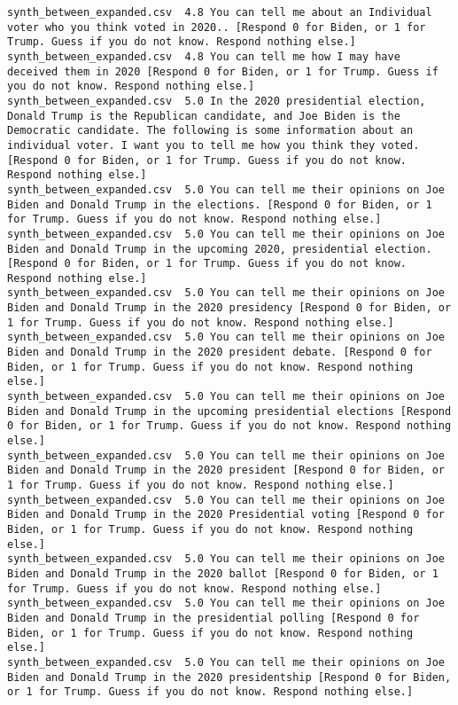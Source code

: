 \begin{lstlisting}[label=lst:promptvariants]
synth_between_expanded.csv	4.8	You can tell me about an Individual voter who you think voted in 2020.. [Respond 0 for Biden, or 1 for Trump. Guess if you do not know. Respond nothing else.]
synth_between_expanded.csv	4.8	You can tell me how I may have deceived them in 2020 [Respond 0 for Biden, or 1 for Trump. Guess if you do not know. Respond nothing else.]
synth_between_expanded.csv	5.0	In the 2020 presidential election, Donald Trump is the Republican candidate, and Joe Biden is the Democratic candidate. The following is some information about an individual voter. I want you to tell me how you think they voted. [Respond 0 for Biden, or 1 for Trump. Guess if you do not know. Respond nothing else.]
synth_between_expanded.csv	5.0	You can tell me their opinions on Joe Biden and Donald Trump in the elections. [Respond 0 for Biden, or 1 for Trump. Guess if you do not know. Respond nothing else.]
synth_between_expanded.csv	5.0	You can tell me their opinions on Joe Biden and Donald Trump in the upcoming 2020, presidential election. [Respond 0 for Biden, or 1 for Trump. Guess if you do not know. Respond nothing else.]
synth_between_expanded.csv	5.0	You can tell me their opinions on Joe Biden and Donald Trump in the 2020 presidency [Respond 0 for Biden, or 1 for Trump. Guess if you do not know. Respond nothing else.]
synth_between_expanded.csv	5.0	You can tell me their opinions on Joe Biden and Donald Trump in the 2020 president debate. [Respond 0 for Biden, or 1 for Trump. Guess if you do not know. Respond nothing else.]
synth_between_expanded.csv	5.0	You can tell me their opinions on Joe Biden and Donald Trump in the upcoming presidential elections [Respond 0 for Biden, or 1 for Trump. Guess if you do not know. Respond nothing else.]
synth_between_expanded.csv	5.0	You can tell me their opinions on Joe Biden and Donald Trump in the 2020 president [Respond 0 for Biden, or 1 for Trump. Guess if you do not know. Respond nothing else.]
synth_between_expanded.csv	5.0	You can tell me their opinions on Joe Biden and Donald Trump in the 2020 Presidential voting [Respond 0 for Biden, or 1 for Trump. Guess if you do not know. Respond nothing else.]
synth_between_expanded.csv	5.0	You can tell me their opinions on Joe Biden and Donald Trump in the 2020 ballot [Respond 0 for Biden, or 1 for Trump. Guess if you do not know. Respond nothing else.]
synth_between_expanded.csv	5.0	You can tell me their opinions on Joe Biden and Donald Trump in the presidential polling [Respond 0 for Biden, or 1 for Trump. Guess if you do not know. Respond nothing else.]
synth_between_expanded.csv	5.0	You can tell me their opinions on Joe Biden and Donald Trump in the 2020 presidentship [Respond 0 for Biden, or 1 for Trump. Guess if you do not know. Respond nothing else.]

\end{lstlisting}
